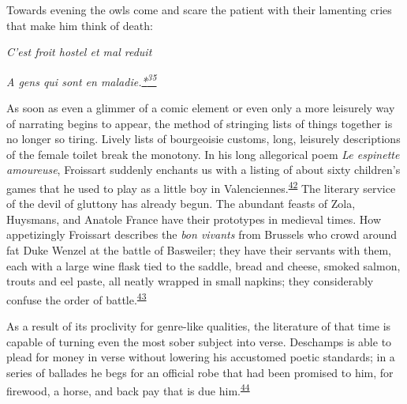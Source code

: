 Towards evening the owls come and scare the patient with their lamenting
cries that make him think of death:

\emph{\protect\hypertarget{21_Chapter_Thirteen__IMAGE_AND_WORD.xhtmlux5cux23page_363}{}{}C'est
froit hostel et mal reduit}

\emph{A gens qui sont en
maladie.\protect\hypertarget{21_Chapter_Thirteen__IMAGE_AND_WORD.xhtmlux5cux23id_2763}{\protect\hyperlink{23_NOTES.xhtmlux5cux23id_2764}{*\textsuperscript{35}}}}

As soon as even a glimmer of a comic element or even only a more
leisurely way of narrating begins to appear, the method of stringing
lists of things together is no longer so tiring. Lively lists of
bourgeoisie customs, long, leisurely descriptions of the female toilet
break the monotony. In his long allegorical poem \emph{Le espinette
amoureuse}, Froissart suddenly enchants us with a listing of about sixty
children's games that he used to play as a little boy in
Valenciennes.\textsuperscript{\protect\hypertarget{21_Chapter_Thirteen__IMAGE_AND_WORD.xhtmlux5cux23id_227}{\protect\hyperlink{23_NOTES.xhtmlux5cux23id_228}{42}}}
The literary service of the devil of gluttony has already begun. The
abundant feasts of Zola, Huysmans, and Anatole France have their
prototypes in medieval times. How appetizingly Froissart describes the
\emph{bon vivants} from Brussels who crowd around fat Duke Wenzel at the
battle of Basweiler; they have their servants with them, each with a
large wine flask tied to the saddle, bread and cheese, smoked salmon,
trouts and eel paste, all neatly wrapped in small napkins; they
considerably confuse the order of
battle.\textsuperscript{\protect\hypertarget{21_Chapter_Thirteen__IMAGE_AND_WORD.xhtmlux5cux23id_225}{\protect\hyperlink{23_NOTES.xhtmlux5cux23id_226}{43}}}

As a result of its proclivity for genre-like qualities, the literature
of that time is capable of turning even the most sober subject into
verse. Deschamps is able to plead for money in verse without lowering
his accustomed poetic standards; in a series of ballades he begs for an
official robe that had been promised to him, for firewood, a horse, and
back pay that is due
him.\textsuperscript{\protect\hypertarget{21_Chapter_Thirteen__IMAGE_AND_WORD.xhtmlux5cux23id_223}{\protect\hyperlink{23_NOTES.xhtmlux5cux23id_224}{44}}}

